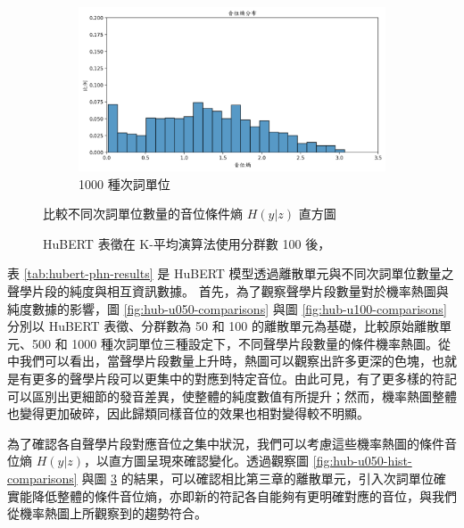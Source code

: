 {{{\begin{figure}
\begin{subfigure}{\textwidth}
                 \label{fig:hub-u100-ap0500-phnent-hist}
             \end{subfigure}
             \vfill
             \begin{subfigure}{\textwidth}
                 \centering
                 \includegraphics[width=\tempwidth]{feasiblefigs/ch4figs/hub-u100-ap1000-phnent-hist.png}
                 \caption{1000 種次詞單位}
                 \label{fig:hub-u100-ap1000-phnent-hist}
             \end{subfigure}

             \caption{HuBERT 表徵在 K-平均演算法使用分群數 100 後，}
             比較不同次詞單位數量的音位條件熵 $H(y|z)$ 直方圖
             \label{fig:hub-u100-hist-comparisons}
        \end{figure}
    }
}


表 \ref{tab:hubert-phn-results} 是 HuBERT 模型透過離散單元與不同次詞單位數量之聲學片段的純度與相互資訊數據。
首先，為了觀察聲學片段數量對於機率熱圖與純度數據的影響，圖 \ref{fig:hub-u050-comparisons} 與圖 \ref{fig:hub-u100-comparisons} 分別以
HuBERT 表徵、分群數為 50 和 100 的離散單元為基礎，比較原始離散單元、500 和 1000 種次詞單位三種設定下，不同聲學片段數量的條件機率熱圖。從中我們可以看出，當聲學片段數量上升時，熱圖可以觀察出許多更深的色塊，也就是有更多的聲學片段可以更集中的對應到特定音位。由此可見，有了更多樣的符記可以區別出更細節的發音差異，使整體的純度數值有所提升；然而，機率熱圖整體也變得更加破碎，因此歸類同樣音位的效果也相對變得較不明顯。

        為了確認各自聲學片段對應音位之集中狀況，我們可以考慮這些機率熱圖的條件音位熵 $H(y|z)$，以直方圖呈現來確認變化。透過觀察圖 \ref{fig:hub-u050-hist-comparisons} 與圖 \ref{fig:hub-u100-hist-comparisons} 的結果，可以確認相比第三章的離散單元，引入次詞單位確實能降低整體的條件音位熵，亦即新的符記各自能夠有更明確對應的音位，與我們從機率熱圖上所觀察到的趨勢符合。
        

}
